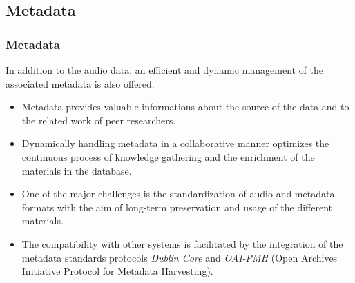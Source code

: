 \documentclass[final, hyperref, table]{beamer}
\begin{document}
\subsection{Metadata}\label{sec:metadata}
\begin{frame}\frametitle{Metadata}
  \begin{block}{}
    In addition to the audio data, an efficient and dynamic management
    of the associated metadata is also offered.
    \begin{itemize}
    \item Metadata provides valuable informations about the
      \alert{source of the data} and to the related \alert{work of
        peer researchers}.
    \item Dynamically handling metadata in a \alert{collaborative}
      manner optimizes the continuous process of knowledge gathering
      and the \alert{enrichment} of the materials in the database.
    \item One of the major challenges is the \alert{standardization}
      of audio and metadata formats with the aim of long-term
      preservation and usage of the different materials.
    \item The compatibility with other systems is facilitated by the
      integration of the \alert{metadata standards protocols}
      \emph{Dublin Core} and \emph{OAI-PMH} (Open Archives Initiative
      Protocol for Metadata Harvesting).
    \end{itemize}
  \end{block}
\end{frame}
\end{document}
